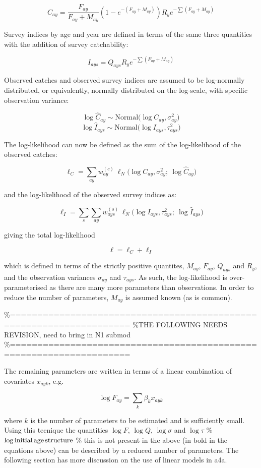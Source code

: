 \documentclass[
]{book}
\begin{document}
\[C_{ay} = \frac{F_{ay}}{F_{ay}+M_{ay}}\left(1 - e^{-(F_{ay}+M_{ay})}\right) R_{y}e^{-\sum (F_{ay} + M_{ay})} \]

Survey indices by age and year are defined in terms of the same three quantities with the addition of survey catchability:

\[I_{ays} = Q_{ays} R_{y}e^{-\sum (F_{ay} + M_{ay})}\]

Observed catches and observed survey indices are assumed to be log-normally distributed, or equivalently, normally distributed on the log-scale, with specific observation variance:

\[ \log \hat{C}_{ay} \sim \text{Normal} \Big( \log C_{ay}, \sigma^2_{ay}\Big) \]
\[ \log \hat{I}_{ays} \sim \text{Normal} \Big( \log I_{ays}, \tau^2_{ays} \Big) \]

The log-likelihood can now be defined as the sum of the log-likelihood of the observed catches:

\[  \ell_C = \sum_{ay} w^{(c)}_{ay}\ \ell_N \Big( \log C_{ay}, \sigma^2_{ay} ;\ \log \hat{C}_{ay} \Big) \]

and the log-likelihood of the observed survey indices as:

\[  \ell_I = \sum_s \sum_{ay} w^{(s)}_{ays}\ \ell_N \Big( \log I_{ays}, \tau_{ays}^2 ;\ \log \hat{I}_{ays} \Big)\]

giving the total log-likelihood

\[\ell = \ell_C + \ell_I\]

which is defined in terms of the strictly positive quantites, \(M_{ay}\), \(F_{ay}\), \(Q_{ays}\) and \(R_{y}\), and the observation variances \(\sigma_{ay}\) and \(\tau_{ays}\). As such, the log-likelihood is over-parameterised as there are many more parameters than observations. In order to reduce the number of parameters, \(M_{ay}\) is assumed known (as is common).

\%====================================================================
\%THE FOLLOWING NEEDS REVISION, need to bring in N1 submod
\%====================================================================

The remaining parameters are written in terms of a linear combination of covariates \(x_{ayk}\), e.g.

\[\log F_{ay} = \sum_k \beta_k x_{ayk}\]

where \(k\) is the number of parameters to be estimated and is sufficiently small. Using this tecnique the quantities \(\log F\), \(\log Q\), \(\log \sigma\) and \(\log \tau\)
\%\(\log \text{initial\,age\,structure}\) \% this is not present in the above
(in bold in the equations above) can be described by a reduced number of parameters. The following section has more discussion on the use of linear models in a4a.
\end{document}
